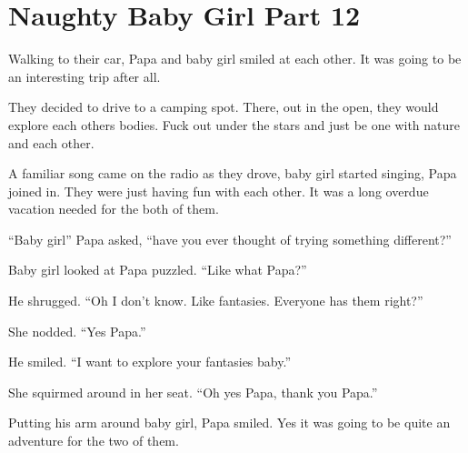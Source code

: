 \section{Naughty Baby Girl Part 12}

     Walking to their car, Papa and baby girl smiled at each other. It was going to be an interesting trip after all.

    They decided to drive to a camping spot. There, out in the open, they would explore each others bodies. Fuck out under the stars and just be one with nature and each other.

    A familiar song came on the radio as they drove, baby girl started singing, Papa joined in. They were just having fun with each other. It was a long overdue vacation needed for the both of them.

    “Baby girl” Papa asked, “have you ever thought of trying something different?”

    Baby girl looked at Papa puzzled. “Like what Papa?”

    He shrugged. “Oh I don’t know. Like fantasies. Everyone has them right?”

    She nodded. “Yes Papa.”

    He smiled. “I want to explore your fantasies baby.”

   She squirmed around in her seat. “Oh yes Papa, thank you Papa.”

   Putting his arm around baby girl, Papa smiled. Yes it was going to be quite an adventure for the two of them.

